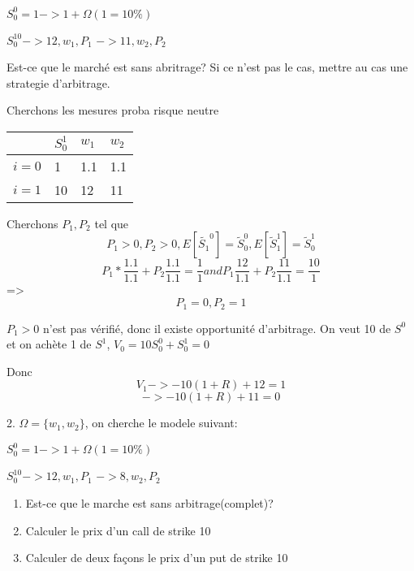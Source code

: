 \documentclass{article}
\begin{document}
$S_0^0=1 -> 1+\Omega(1=10\%)$

$S_0^10->12, w_1,P_1$
$-> 11, w_2,P_2$

Est-ce que le march\'e est sans abritrage? Si ce n'est pas le cas, mettre au cas une strategie d'arbitrage.

Cherchons les mesures proba risque neutre
\begin{center}
\begin{tabular}{l|lll}
   & $S_0^1$ & $w_1$ & $w_2$ \\ \hline 
 $i=0$ & 1 & 1.1 & 1.1 \\
 $i=1$ & 10 & 12 & 11 \\
\end{tabular}	
\end{center}

Cherchons $P_1, P_2$ tel que 
\begin{equation}
P_1>0, P_2>0, E[\tilde{S_1}^0] = \tilde{S}_0^0, E[\tilde{S}_1^1]=\tilde{S}_0^1
\end{equation}
\begin{equation}
P_1*\frac{1.1}{1.1}+P_2\frac{1.1}{1.1}=\frac{1}{1} and P_1\frac{12}{1.1}+P_2\frac{11}{1.1}=\frac{10}{1}
\end{equation}
=>
\begin{equation}
P_1=0, P_2=1
\end{equation}
 
$P_1>0$ n'est pas v\'erifi\'e, donc il existe opportunit\'e d'arbitrage.
On veut 10 de $S^0$ et on ach\`ete 1 de $S^1$,
$V_0=10S_0^0+S_0^1=0$

Donc 
\begin{equation}
V_1-> -10(1+R)+12=1
\end{equation}
\begin{equation}
->-10(1+R)+11=0
\end{equation}


2. $\Omega=\{w_1, w_2\}$, on cherche le modele suivant:

$S_0^0=1 -> 1+\Omega(1=10\%)$

$S_0^10->12, w_1, P_1$
$-> 8, w_2, P_2$

\begin{enumerate}
\item Est-ce que le marche est sans arbitrage(complet)?
\item Calculer le prix d'un call de strike 10
\item Calculer de deux fa\c{c}ons le prix d'un put de strike 10
\end{enumerate}
\end{document}
